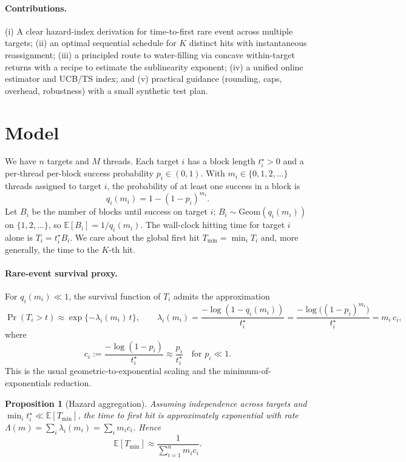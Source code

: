 \documentclass[11pt]{article}
\newtheorem{proposition}{Proposition}
\newcommand{\E}{\mathbb{E}}
\newcommand{\1}{\mathbf{1}}
\begin{document}
\paragraph{Contributions.}
(i) A clear hazard-index derivation for time-to-first rare event across multiple targets; (ii) an optimal sequential schedule for $K$ distinct hits with instantaneous reassignment; (iii) a principled route to water-filling via concave within-target returns with a recipe to estimate the sublinearity exponent; (iv) a unified online estimator and UCB/TS index; and (v) practical guidance (rounding, caps, overhead, robustness) with a small synthetic test plan.

\section{Model}
We have $n$ targets and $M$ threads. Each target $i$ has a block length $t_i^\star>0$ and a per-thread per-block success probability $p_i\in(0,1)$. With $m_i\in\{0,1,2,\ldots\}$ threads assigned to target $i$, the probability of at least one success in a block is
\begin{equation}
q_i(m_i) = 1-(1-p_i)^{m_i}.
\end{equation}
Let $B_i$ be the number of blocks until success on target $i$; $B_i\sim\mathrm{Geom}(q_i(m_i))$ on $\{1,2,\ldots\}$, so $\E[B_i]=1/q_i(m_i)$. The wall-clock hitting time for target $i$ alone is $T_i = t_i^\star B_i$. We care about the global first hit $T_{\min}=\min_i T_i$ and, more generally, the time to the $K$-th hit.

\paragraph{Rare-event survival proxy.}
For $q_i(m_i)\ll 1$, the survival function of $T_i$ admits the approximation
\begin{equation}
\Pr(T_i>t) \approx \exp\{-\lambda_i(m_i)\,t\},\qquad
\lambda_i(m_i)=\frac{-\log(1-q_i(m_i))}{t_i^\star}
=\frac{-\log\big((1-p_i)^{m_i}\big)}{t_i^\star}= m_i\,c_i,
\end{equation}
where
\begin{equation}
c_i := \frac{-\log(1-p_i)}{t_i^\star}\approx \frac{p_i}{t_i^\star}\quad\text{for }p_i\ll 1.
\end{equation}
This is the usual geometric-to-exponential scaling and the minimum-of-exponentials reduction\cite{Durrett2019,Ross2014}.

\begin{proposition}[Hazard aggregation]
\label{prop:haz}
Assuming independence across targets and $\min_i t_i^\star \ll \E[T_{\min}]$, the time to first hit is approximately exponential with rate $\Lambda(m)=\sum_i \lambda_i(m_i)=\sum_i m_i c_i$. Hence
\begin{equation}
\label{eq:objective}
\E[T_{\min}] \approx \frac{1}{\sum_{i=1}^n m_i c_i}.
\end{equation}
\end{proposition}
\end{document}
